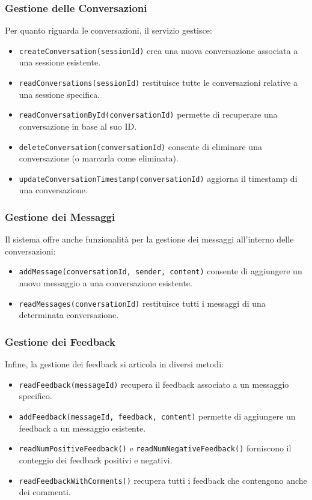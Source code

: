 \subsubsection*{Gestione delle Conversazioni}
Per quanto riguarda le conversazioni, il servizio gestisce:
\begin{itemize}
    \item \texttt{createConversation(sessionId)} crea una nuova conversazione associata a una sessione esistente.
    \item \texttt{readConversations(sessionId)} restituisce tutte le conversazioni relative a una sessione specifica.
    \item \texttt{readConversationById(conversationId)} permette di recuperare una conversazione in base al suo ID.
    \item \texttt{deleteConversation(conversationId)} consente di eliminare una conversazione (o marcarla come eliminata).
    \item \texttt{updateConversationTimestamp(conversationId)} aggiorna il timestamp di una conversazione.
\end{itemize}

\subsubsection*{Gestione dei Messaggi}
Il sistema offre anche funzionalità per la gestione dei messaggi all’interno delle conversazioni:
\begin{itemize}
    \item \texttt{addMessage(conversationId, sender, content)} consente di aggiungere un nuovo messaggio a una conversazione esistente.
    \item \texttt{readMessages(conversationId)} restituisce tutti i messaggi di una determinata conversazione.
\end{itemize}

\subsubsection*{Gestione dei Feedback}
Infine, la gestione dei feedback si articola in diversi metodi:
\begin{itemize}
    \item \texttt{readFeedback(messageId)} recupera il feedback associato a un messaggio specifico.
    \item \texttt{addFeedback(messageId, feedback, content)} permette di aggiungere un feedback a un messaggio esistente.
    \item \texttt{readNumPositiveFeedback()} e \texttt{readNumNegativeFeedback()} forniscono il conteggio dei feedback positivi e negativi.
    \item \texttt{readFeedbackWithComments()} recupera tutti i feedback che contengono anche dei commenti.
\end{itemize}

